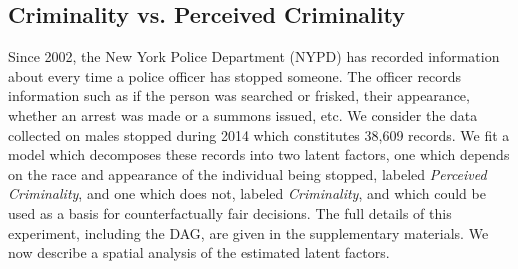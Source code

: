 

\subsection{Criminality vs. Perceived Criminality}
\label{sec:true-vs.-perceived}
Since 2002, the New York Police Department (NYPD) has recorded
information about every time a police officer has stopped someone. The
officer records information such as if the person was searched or
frisked, %
their appearance, whether an arrest was made or a summons issued, %
etc. We
consider the data collected on males stopped during 2014 which constitutes 38,609 records. %
We fit a model which decomposes these records into two latent factors, one which depends on the race and appearance of the individual being stopped, labeled \emph{Perceived Criminality}, and one which does not, labeled \emph{Criminality}, and which could be used as a basis for counterfactually fair decisions. The full details of this experiment, including the DAG, are given in the supplementary materials. We now describe a spatial analysis of the estimated latent factors.

